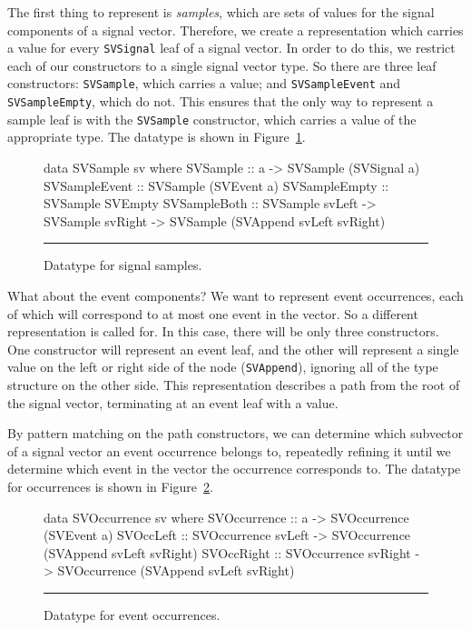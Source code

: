The first thing to represent is {\em samples}, which are sets of values for
the signal components of a signal vector. Therefore, we create a representation
which carries a value for every {\tt SVSignal} leaf of a signal vector. In order
to do this, we restrict each of our constructors to a single signal vector type.
So there are three leaf constructors: {\tt SVSample}, which carries a value; and
{\tt SVSampleEvent} and {\tt SVSampleEmpty}, which do not. This ensures that the
only way to represent a sample leaf is with the {\tt SVSample} constructor,
which carries a value of the appropriate type. The datatype is shown in
Figure~\ref{figure:signal_sample_datatype}.

\begin{figure}
\begin{code}
data SVSample sv where
  SVSample      ::    a
                   -> SVSample (SVSignal a)
  SVSampleEvent ::    SVSample (SVEvent a)
  SVSampleEmpty ::    SVSample SVEmpty
  SVSampleBoth  ::    SVSample svLeft
                   -> SVSample svRight
                   -> SVSample (SVAppend svLeft svRight)
\end{code}
\hrule
\caption{Datatype for signal samples.}
\label{figure:signal_sample_datatype}
\end{figure}

What about the event components? We want to represent event occurrences,
each of which will correspond to at most one event in the vector. So a different
representation is called for. In this case, there will be only three
constructors. One constructor will represent an event leaf, and the other will
represent a single value on the left or right side of the node ({\tt SVAppend}),
ignoring all of the type structure on the other side. This representation
describes a path from the root of the signal vector, terminating at an event
leaf with a value.

By pattern matching on the path constructors, we can determine which subvector
of a signal vector an event occurrence belongs to, repeatedly refining it until
we determine which event in the vector the occurrence corresponds to. The
datatype for occurrences is shown in Figure~\ref{figure:event_occurrence_datatype}.

\begin{figure}
\begin{code}
data SVOccurrence sv where
  SVOccurrence ::    a
                  -> SVOccurrence (SVEvent a)
  SVOccLeft    ::    SVOccurrence svLeft
                  -> SVOccurrence (SVAppend svLeft svRight)
  SVOccRight   ::    SVOccurrence svRight 
                  -> SVOccurrence (SVAppend svLeft svRight)
\end{code}
\hrule
\caption{Datatype for event occurrences.}
\label{figure:event_occurrence_datatype}
\end{figure}


